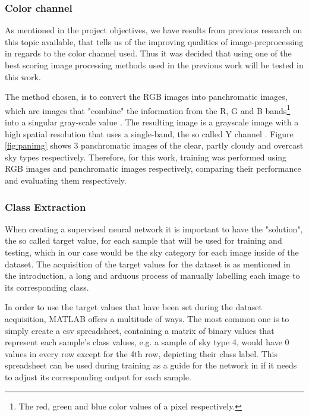 
\subsubsection{Color channel}
As mentioned in the project objectives, we have results from previous research on this topic \cite{skyClassANN-Granados-Lopéz} available, that tells us of the improving qualities of image-preprocessing in regards to the color channel used. Thus it was decided that using one of the best scoring image processing methods used in the previous work will be tested in this work.

The method chosen, is to convert the RGB images into panchromatic images, which are images that "combine" the information from the R, G and B bands\footnote{The red, green and blue color values of a pixel respectively.} into a singular gray-scale value \cite{matlab:panc}. The resulting image is a grayscale image with a high spatial resolution that uses a single-band, the so called Y channel \cite{sDirect:panc}. Figure \ref{fig:panimg} shows 3 panchromatic images of the clear, partly cloudy and overcast sky types respectively.
Therefore, for this work, training was performed using RGB images and panchromatic images respectively, comparing their performance and evaluating them respectively.

\subsubsection{Class Extraction}
When creating a supervised neural network it is important to have the "solution", the so called target value, for each sample that will be used for training and testing, which in our case would be the sky category for each image inside of the dataset. The acquisition of the target values for the dataset is as mentioned in the introduction, a long and arduous process of manually labelling each image to its corresponding class. 

In order to use the target values that have been set during the dataset acquisition, MATLAB offers a multitude of ways. The most common one is to simply create a csv spreadsheet, containing a matrix of binary values that represent each sample's class values, e.g. a sample of sky type 4, would have 0 values in every row except for the 4th row, depicting their class label. This spreadsheet can be used during training as a guide for the network in if it needs to adjust its corresponding output for each sample.

